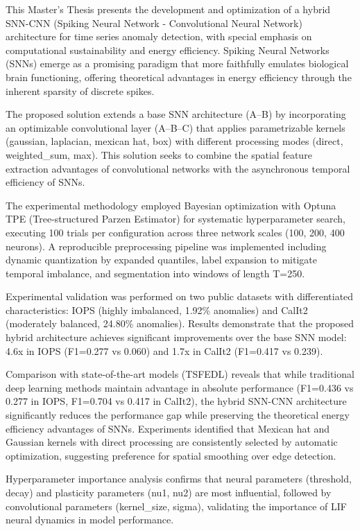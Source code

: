 This Master's Thesis presents the development and optimization of a hybrid SNN-CNN (Spiking Neural Network - Convolutional Neural Network) architecture for time series anomaly detection, with special emphasis on computational sustainability and energy efficiency. Spiking Neural Networks (SNNs) emerge as a promising paradigm that more faithfully emulates biological brain functioning, offering theoretical advantages in energy efficiency through the inherent sparsity of discrete spikes.

The proposed solution extends a base SNN architecture (A--B) by incorporating an optimizable convolutional layer (A--B--C) that applies parametrizable kernels (gaussian, laplacian, mexican hat, box) with different processing modes (direct, weighted\_sum, max). This solution seeks to combine the spatial feature extraction advantages of convolutional networks with the asynchronous temporal efficiency of SNNs.

The experimental methodology employed Bayesian optimization with Optuna TPE (Tree-structured Parzen Estimator) for systematic hyperparameter search, executing 100 trials per configuration across three network scales (100, 200, 400 neurons). A reproducible preprocessing pipeline was implemented including dynamic quantization by expanded quantiles, label expansion to mitigate temporal imbalance, and segmentation into windows of length T=250.

Experimental validation was performed on two public datasets with differentiated characteristics: IOPS (highly imbalanced, 1.92\% anomalies) and CalIt2 (moderately balanced, 24.80\% anomalies). Results demonstrate that the proposed hybrid architecture achieves significant improvements over the base SNN model: 4.6x in IOPS (F1=0.277 vs 0.060) and 1.7x in CalIt2 (F1=0.417 vs 0.239).

Comparison with state-of-the-art models (TSFEDL) reveals that while traditional deep learning methods maintain advantage in absolute performance (F1=0.436 vs 0.277 in IOPS, F1=0.704 vs 0.417 in CalIt2), the hybrid SNN-CNN architecture significantly reduces the performance gap while preserving the theoretical energy efficiency advantages of SNNs. Experiments identified that Mexican hat and Gaussian kernels with direct processing are consistently selected by automatic optimization, suggesting preference for spatial smoothing over edge detection.

Hyperparameter importance analysis confirms that neural parameters (threshold, decay) and plasticity parameters (nu1, nu2) are most influential, followed by convolutional parameters (kernel\_size, sigma), validating the importance of LIF neural dynamics in model performance.

